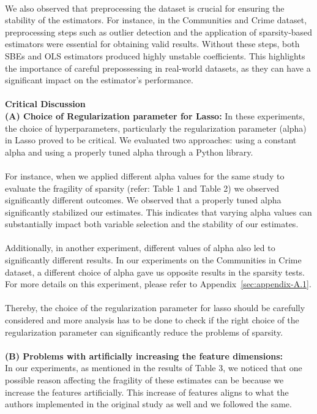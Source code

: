 \\
We also observed that preprocessing the dataset is crucial for ensuring the stability of the estimators. For instance, in the Communities and Crime dataset, preprocessing steps such as outlier detection and the application of sparsity-based estimators were essential for obtaining valid results. Without these steps, both SBEs and OLS estimators produced highly unstable coefficients. This highlights the importance of careful prepossessing in real-world datasets, as they can have a significant impact on the estimator's performance.\\
\\
\textbf{Critical Discussion}
\\
\textbf{(A) Choice of Regularization parameter for Lasso:}
In these experiments, the choice of hyperparameters, particularly the regularization parameter (alpha) in Lasso proved to be critical. We evaluated two approaches: using a constant alpha and using a properly tuned alpha through a Python library. \\
\\
For instance, when we applied different alpha values for the same study to evaluate the fragility of sparsity (refer: Table 1 and Table 2) we observed significantly different outcomes. We observed that a properly tuned alpha significantly stabilized our estimates. This indicates that varying alpha values can substantially impact both variable selection and the stability of our estimates.\\
\\
Additionally, in another experiment, different values of alpha also led to significantly different results. In our experiments on the Communities in Crime dataset, a different choice of alpha gave us opposite results in the sparsity tests. For more details on this experiment, please refer to Appendix~\ref{sec:appendix-A.1}.\\
\\
Thereby, the choice of the regularization parameter for lasso should be carefully considered and more analysis has to be done to check if the right choice of the regularization parameter can significantly reduce the problems of sparsity. \\
\\
\textbf{(B) Problems with artificially increasing the feature dimensions:}\\
In our experiments, as mentioned in the results of Table 3, we noticed that one possible reason affecting the fragility of these estimates can be because we increase the features artificially. This increase of features aligns to what the authors implemented in the original study as well and we followed the same. 
